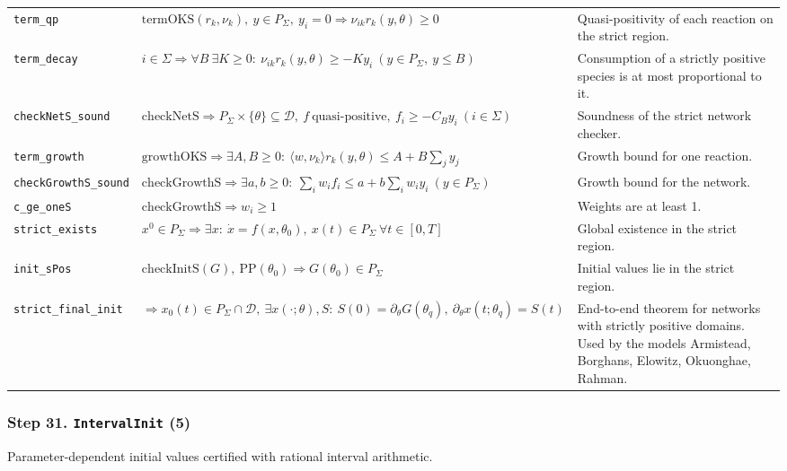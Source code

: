 {\begin{longtable}{@{}>{\raggedright\arraybackslash}p{3.6cm}>{\raggedright\arraybackslash}p{6.6cm}>{\raggedright\arraybackslash}p{5.6cm}@{}}
\texttt{term\_\allowbreak{}qp} & $\displaystyle \mathrm{termOKS}(r_k,\nu_k),\ y\in P_\Sigma,\ y_i=0\Rightarrow\nu_{ik}r_k(y,\theta)\ge0$ & Quasi-positivity of each reaction on the strict region. \\[3pt]
\texttt{term\_\allowbreak{}decay} & $\displaystyle i\in\Sigma\Rightarrow\forall B\ \exists K\ge0:\ \nu_{ik}r_k(y,\theta)\ge-Ky_i\ (y\in P_\Sigma,\ y\le B)$ & Consumption of a strictly positive species is at most proportional to it. \\[3pt]
\texttt{checkNetS\_\allowbreak{}sound} & $\displaystyle \mathrm{checkNetS}\Rightarrow P_\Sigma\times\{\theta\}\subseteq\mathcal D,\ f\ \text{quasi-positive},\ f_i\ge-C_By_i\ (i\in\Sigma)$ & Soundness of the strict network checker. \\[3pt]
\texttt{term\_\allowbreak{}growth} & $\displaystyle \mathrm{growthOKS}\Rightarrow\exists A,B\ge0:\ \langle w,\nu_k\rangle r_k(y,\theta)\le A+B\sum_jy_j$ & Growth bound for one reaction. \\[3pt]
\texttt{checkGrowthS\_\allowbreak{}sound} & $\displaystyle \mathrm{checkGrowthS}\Rightarrow\exists a,b\ge0:\ \sum_iw_if_i\le a+b\sum_iw_iy_i\ (y\in P_\Sigma)$ & Growth bound for the network. \\[3pt]
\texttt{c\_\allowbreak{}ge\_\allowbreak{}oneS} & $\displaystyle \mathrm{checkGrowthS}\Rightarrow w_i\ge1$ & Weights are at least 1. \\[3pt]
\texttt{strict\_\allowbreak{}exists} & $\displaystyle x^0\in P_\Sigma\Rightarrow\exists x:\ \dot x=f(x,\theta_0),\ x(t)\in P_\Sigma\ \forall t\in[0,T]$ & Global existence in the strict region. \\[3pt]
\texttt{init\_\allowbreak{}sPos} & $\displaystyle \mathrm{checkInitS}(G),\ \mathrm{PP}(\theta_0)\Rightarrow G(\theta_0)\in P_\Sigma$ & Initial values lie in the strict region. \\[3pt]
\texttt{strict\_\allowbreak{}final\_\allowbreak{}init} & $\displaystyle \Rightarrow x_0(t)\in P_\Sigma\cap\mathcal D,\ \exists x(\cdot;\theta),S:\ S(0)=\partial_\theta G(\theta_q),\ \partial_\theta x(t;\theta_q)=S(t)$ & End-to-end theorem for networks with strictly positive domains. Used by the models Armistead, Borghans, Elowitz, Okuonghae, Rahman. \\[3pt]
\bottomrule
\end{longtable}
}

\subsubsection*{Step 31. \texttt{IntervalInit} (5)}
Parameter-dependent initial values certified with rational interval arithmetic.

